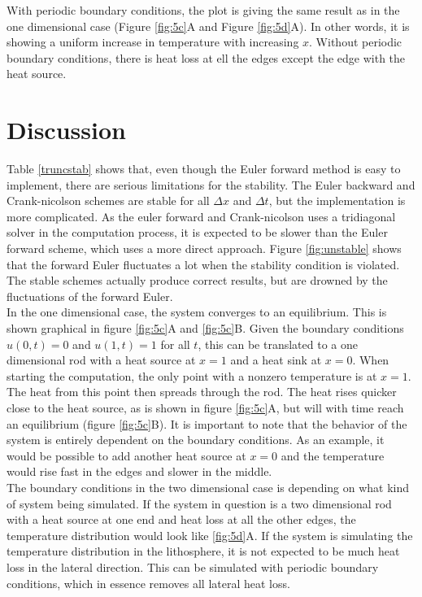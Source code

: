 \documentclass[10pt,a4paper]{article}
\begin{document}
\noindent With periodic boundary conditions, the plot is giving the same result as in the one dimensional case (Figure \ref{fig:5c}A and Figure \ref{fig:5d}A). In other words, it is showing a uniform increase in temperature with increasing $x$.   Without periodic boundary conditions, there is heat loss at ell the edges except the edge with the heat source. 


\newpage
\section*{Discussion}

Table \ref{truncstab} shows that, even though the Euler forward method is easy to implement, there are serious limitations for the stability. The Euler backward and Crank-nicolson schemes are stable for all $\Delta x$ and $\Delta t$, but the implementation is more complicated. As the euler forward and Crank-nicolson uses a tridiagonal solver in the computation process, it is expected to be slower than the Euler forward scheme, which uses a more direct approach. Figure \ref{fig:unstable} shows that the forward Euler fluctuates a lot when the stability condition is violated. The stable schemes actually produce correct results, but are drowned by the fluctuations of the forward Euler. 
\\

\noindent In the one dimensional case, the system converges to an equilibrium. This is shown graphical in figure \ref{fig:5c}A and \ref{fig:5c}B. Given the boundary conditions $u(0,t)=0$ and $u(1,t)=1$ for all $t$, this can be translated to a one dimensional rod with  a heat source at $x=1$ and a heat sink at $x=0$. When starting the computation, the only point with a nonzero temperature is at $x=1$. The heat from this point then spreads through the rod. The heat rises quicker close to the heat source, as is shown in figure \ref{fig:5c}A, but will with time reach an equilibrium (figure \ref{fig:5c}B). It is important to note that the behavior of the system is entirely dependent on the boundary conditions. As an example, it would be possible to add another heat source at $x=0$ and the temperature would rise fast in the edges and slower in the middle. 
\\

\noindent The boundary conditions in the two dimensional case is depending on what kind of system being simulated. If the system in question is a two dimensional rod with a heat source at one end and heat loss at all the other edges, the temperature distribution would look like \ref{fig:5d}A. If the system is simulating the temperature distribution in the lithosphere, it is not expected to be much heat loss in the lateral direction. This can be simulated with periodic boundary conditions, which in essence removes all lateral heat loss. 
\\
\end{document}

